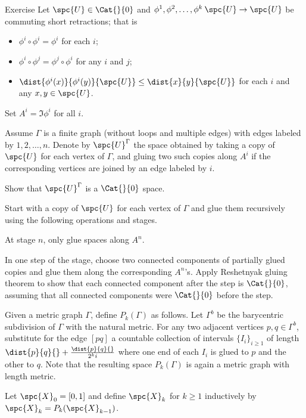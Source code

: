 \begin{thm}{Exercise}\label{ex:short-retracts}
Let $\spc{U}\in \Cat{}{0}$
and $\phi^1,\phi^2,\dots,\phi^k\:\spc{U}\to \spc{U}$ be commuting short retractions; 
that is 
\begin{itemize}
\item $\phi^i\circ\phi^i=\phi^i$ for each $i$;
\item $\phi^i\circ\phi^j=\phi^j\circ\phi^i$ for any $i$ and $j$;
\item $\dist{\phi^i(x)}{\phi^i(y)}{\spc{U}}\le \dist{x}{y}{\spc{U}}$ for each $i$ and any $x,y\in\spc{U}$.
\end{itemize}
Set $A^i=\Im \phi^i$ for all $i$.

Assume $\Gamma$ is a finite graph 
(without loops and multiple edges) 
with edges labeled by $1,2,\dots, n$.
Denote by $\spc{U}^\Gamma$ the space obtained by taking 
a copy of $\spc{U}$ for each vertex of $\Gamma$, and 
gluing two such copies along $A^i$ if the corresponding vertices are joined by an edge labeled by $i$.

Show that $\spc{U}^\Gamma$ is a $\Cat{}{0}$ space.
\end{thm}

Start with a copy of $\spc{U}$ for each vertex of $\Gamma$
and glue them recursively using the following operations and stages.

At  stage $n$, only glue  spaces along $A^n$.

In one step of the stage, choose two connected components of partially glued copies and glue them along the corresponding $A^n$'s.
Apply Reshetnyak gluing theorem to show that each connected component after the step is $\Cat{}{0}$, assuming that all connected components were $\Cat{}{0}$ before the step.
\qeds




Given a metric graph $\Gamma$,  define $P_k(\Gamma)$ as follows. Let $\Gamma^b$ be the barycentric subdivision of $\Gamma$ with the natural metric. For any two adjacent vertices $p,q\in\Gamma^b$, substitute for the edge $[pq]$ a countable collection of intervals $\{I_i\}_{i\ge 1}$ of length $\dist{p}{q}{}+\frac{\dist{p}{q}{}}{2^ki}$ where one end of each $I_i$ is glued to $p$ and the other to $q$. Note that the resulting space $P_k(\Gamma)$ is again a metric graph  with length metric. 

Let $\spc{X}_0=[0,1]$ and define $\spc{X}_k$ for $k\ge 1$ inductively by $\spc{X}_k=P_k(\spc{X}_{k-1})$.

